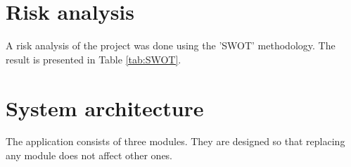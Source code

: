 \documentclass[a4paper, 11pt, twoside]{report}
\theoremstyle{definition}
\begin{document}
\vfill
\section{Risk analysis}
A risk analysis of the project was done using the 'SWOT' methodology. The result is presented in Table \ref{tab:SWOT}. \par

\vfill
\section{System architecture}

The application consists of three modules. They are designed so that replacing any module does not affect other ones. \par

\vfill
\newpage
\end{document}
